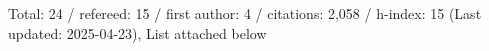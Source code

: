 Total: 24 / refereed: 15 / first author: 4 / citations: 2,058 / h-index: 15 (Last updated: 2025-04-23), List attached below